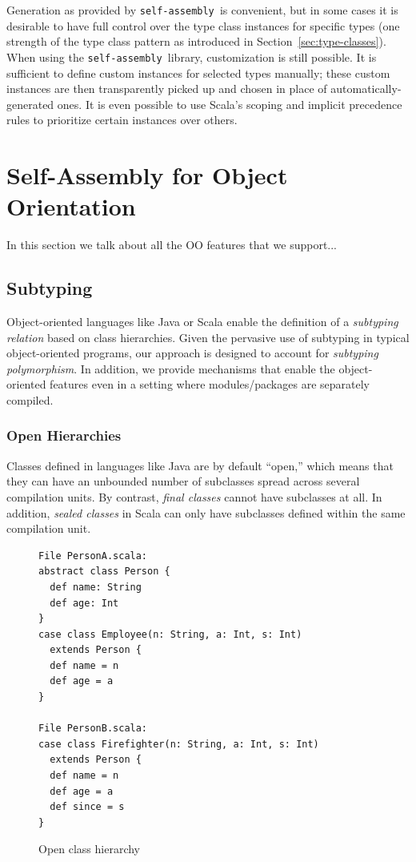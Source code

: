 \documentclass[preprint]{sigplanconf}
\newcommand{\selfassembly}{\texttt{self-assembly~}}
\begin{document}
Generation as provided by \selfassembly is convenient, but in some cases it is desirable
to have full control over the type class instances for specific types (one strength of the
type class pattern as introduced in Section~\ref{sec:type-classes}). When using the
\selfassembly library, customization is still possible. It is sufficient to define
custom instances for selected types manually; these custom instances are then transparently
picked up and chosen in place of automatically-generated ones. It is even possible to
use Scala's scoping and implicit precedence rules to prioritize certain instances over
others.

\section{Self-Assembly for Object Orientation}

In this section we talk about all the OO features that we support...

\subsection{Subtyping}

Object-oriented languages like Java or Scala enable the definition of a
\emph{subtyping relation} based on class hierarchies. Given the pervasive use
of subtyping in typical object-oriented programs, our approach is designed to
account for \emph{subtyping polymorphism}. In addition, we provide mechanisms
that enable the object-oriented features even in a setting where
modules/packages are separately compiled.

\subsubsection{Open Hierarchies}

Classes defined in languages like Java are by default ``open,'' which means
that they can have an unbounded number of subclasses spread across several
compilation units. By contrast, \emph{final classes} cannot have subclasses at
all. In addition, \emph{sealed classes} in Scala can only have subclasses
defined within the same compilation unit.

\begin{figure}
\centering
\begin{lstlisting}
File PersonA.scala:
abstract class Person {
  def name: String
  def age: Int
}
case class Employee(n: String, a: Int, s: Int)
  extends Person {
  def name = n
  def age = a
}

File PersonB.scala:
case class Firefighter(n: String, a: Int, s: Int)
  extends Person {
  def name = n
  def age = a
  def since = s
}
\end{lstlisting}
  \caption{Open class hierarchy}
  \label{fig:class-hierarchy}
\end{figure}
\end{document}

